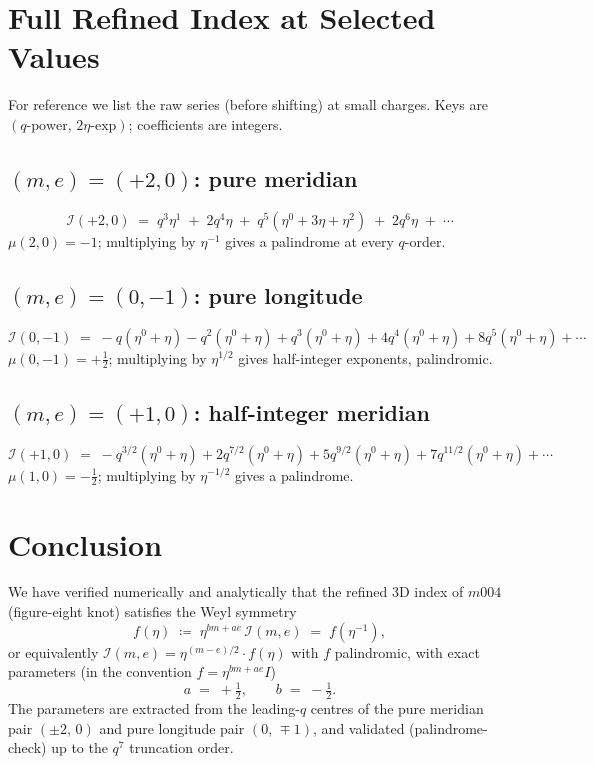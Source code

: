 \documentclass[12pt,a4paper]{article}
\newcommand{\IRef}{\mathcal{I}}
\theoremstyle{definition}
\begin{document}
\section{Full Refined Index at Selected Values}

For reference we list the raw series (before shifting) at small charges.
Keys are $(q\text{-power},\, 2\eta\text{-exp})$; coefficients are integers.

\subsection{\texorpdfstring{$(m,e)=(+2,0)$}{(m,e)=(2,0)}: pure meridian}

\[
  \IRef(+2,0) \;=\;
  q^3 \eta^{1} \;+\; 2q^4\eta \;+\; q^5(\eta^0 + 3\eta + \eta^2) \;+\; 2q^6\eta \;+\; \cdots
\]
$\mu(2,0)=-1$; multiplying by $\eta^{-1}$ gives a palindrome at every $q$-order. \checkmark

\subsection{\texorpdfstring{$(m,e)=(0,-1)$}{(m,e)=(0,-1)}: pure longitude}

\[
  \IRef(0,-1) \;=\;
  -q(\eta^0 + \eta) - q^2(\eta^0 + \eta) + q^3(\eta^0+\eta)
  + 4q^4(\eta^0+\eta) + 8q^5(\eta^0+\eta) + \cdots
\]
$\mu(0,-1)=+\tfrac12$; multiplying by $\eta^{1/2}$ gives half-integer exponents,
palindromic. \checkmark

\subsection{\texorpdfstring{$(m,e)=(+1,0)$}{(m,e)=(1,0)}: half-integer meridian}

\[
  \IRef(+1,0) \;=\;
  -q^{3/2}(\eta^0 + \eta) + 2q^{7/2}(\eta^0+\eta)
  + 5q^{9/2}(\eta^0+\eta) + 7q^{11/2}(\eta^0+\eta) + \cdots
\]
$\mu(1,0)=-\tfrac12$; multiplying by $\eta^{-1/2}$ gives a palindrome. \checkmark

\section{Conclusion}

We have verified numerically and analytically that the refined 3D index
of $m004$ (figure-eight knot) satisfies the Weyl symmetry
\[
  f(\eta) \;\coloneqq\; \eta^{bm+ae}\,\IRef(m,e) \;=\; f(\eta^{-1}),
\]
or equivalently $\IRef(m,e) = \eta^{(m-e)/2}\cdot f(\eta)$ with $f$ palindromic,
with exact parameters (in the convention $f=\eta^{bm+ae}I$)
\[
  \boxed{a \;=\; +\tfrac{1}{2}, \qquad b \;=\; -\tfrac{1}{2}.}
\]
The parameters are extracted from the leading-$q$ centres of the pure
meridian pair $(\pm 2,\,0)$ and pure longitude pair $(0,\,\mp 1)$,
and validated (palindrome-check) up to the $q^7$ truncation order.
\end{document}

